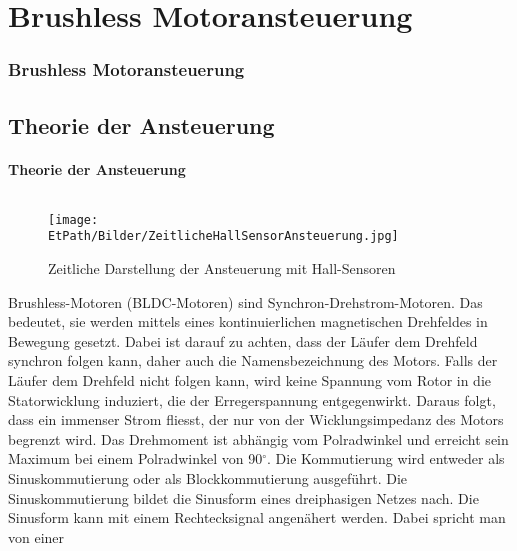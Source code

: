 \ifSTANDALONE
\section{Brushless Motoransteuerung}
\fi
\ifEMBED
\subsubsection{Brushless Motoransteuerung}
\fi

\ifEMBED
    \BLDCcollab
\fi
\ifSTANDALONE
    \subsection{Theorie der Ansteuerung}
    \fi
\ifEMBED
    \paragraph{Theorie der Ansteuerung}$~~$\\
    \fi
    \ifEMBED
        \begin{wrapfigure}{r}{0.50\textwidth}
           	\texttt{[image: \\EtPath/Bilder/ZeitlicheHallSensorAnsteuerung.jpg]}
         	\centering
           	\caption[Zeitliche Darstellung der Ansteuerung mit Hall-Sensoren]
           	{Zeitliche Darstellung der Ansteuerung mit Hall-Sensoren \cite{AppNote:BrushlessuC}}
            \label{abb:ZeitlicheAnsteuerungBrushlessMotor}
        \end{wrapfigure}
    \fi
        Brushless-Motoren (BLDC-Motoren) sind Synchron-Drehstrom-Motoren. Das 
        bedeutet, sie werden mittels eines kontinuierlichen magnetischen 
        Drehfeldes in Bewegung gesetzt.  Dabei ist darauf zu achten, dass der 
        Läufer dem Drehfeld synchron folgen kann, daher auch die 
        Namensbezeichnung des Motors. Falls der Läufer dem Drehfeld nicht 
        folgen kann, wird keine Spannung vom Rotor in die Statorwicklung 
        induziert, die der Erregerspannung entgegenwirkt. Daraus folgt, dass 
        ein immenser Strom fliesst, der nur von der Wicklungsimpedanz des 
        Motors begrenzt wird. Das Drehmoment ist abhängig vom Polradwinkel und 
        erreicht sein Maximum bei einem Polradwinkel von 90$^\circ$. Die 
        Kommutierung wird entweder als Sinuskommutierung oder als 
        Blockkommutierung ausgeführt. Die Sinuskommutierung bildet die 
        Sinusform eines dreiphasigen Netzes nach. Die Sinusform kann mit einem 
        Rechtecksignal angenähert werden. Dabei spricht man von einer 
